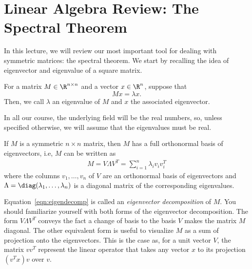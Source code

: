 \section{Linear Algebra Review: The Spectral Theorem}

In this lecture, we will review our most important tool for dealing with symmetric matrices: the spectral theorem. We start by recalling the idea of eigenvector and eigenvalue of a square matrix.

\begin{definition} %
For a matrix $M \in \R^{n \times n}$ and a vector $x \in \R^n$, suppose that
$$
Mx = \lambda x.
$$
Then, we call  $\lambda$ an \textrm{eigenvalue} of $M$ and $x$ the associated \textrm{eigenvector}.
\end{definition}
In all our course, the underlying field will be the real numbers, so, unless specified otherwise, we will assume that the eigenvalues must be real.


\begin{theorem}
If $M$ is a symmetric $n\times n$ matrix, then $M$ has a full orthonormal basis of eigenvectors, i.e, $M$ can be written as
\begin{align}\label{eqn:eigendecomp}
M = V \Lambda V^T = \sum_{i=1}^{n} \lambda_i v_i v_i^T
\end{align}
where the columns $v_1, \ldots, v_n$ of $V$ are an orthonormal basis of eigenvectors and $\Lambda=\diag(\lambda_1, \ldots, \lambda_n)$ is a diagonal matrix of the corresponding eigenvalues.
\end{theorem}
Equation~\ref{eqn:eigendecomp} is called an {\it eigenvector decomposition} of $M$. You should familiarize yourself with both forms of the eigenvector decomposition. The form $V \Lambda V^T$ conveys the fact a change of basis to the basis $V$ makes the matrix $M$ diagonal. The other equivalent form is useful to visualize $M$ as a sum of projection onto the eigenvectors. This is the case as, for a unit vector $V$, the matrix $vv^T$ represent the linear operator that takes any vector $x$ to its projection  $(v^T x) v$ over $v.$


